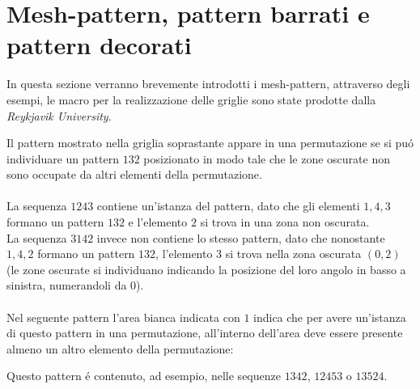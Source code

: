 \section*{Mesh-pattern, pattern barrati e pattern decorati}
In questa sezione verranno brevemente introdotti i mesh-pattern\cite{branden2011mesh}, attraverso degli esempi, le macro per la realizzazione delle griglie sono state prodotte dalla \textit{Reykjavik University}\cite{patternmacros}.
\begin{center}
\end{center}
Il pattern mostrato nella griglia soprastante appare in una permutazione se si pu\'o individuare un pattern $132$ posizionato in modo tale che le zone oscurate non sono occupate da altri elementi della permutazione.\\\\
La sequenza $1243$ contiene un'istanza del pattern, dato che gli elementi $1,4,3$ formano un pattern $132$ e l'elemento $2$ si trova in una zona non oscurata.\\
La sequenza $3142$ invece non contiene lo stesso pattern, dato che nonostante $1,4,2$ formano un pattern $132$, l'elemento 3 si trova nella zona oscurata $(0,2)$ (le zone oscurate si individuano indicando la posizione del loro angolo in basso a sinistra, numerandoli da $0$).\\\\
Nel seguente pattern l'area bianca indicata con $1$ indica che per avere un'istanza di questo pattern in una permutazione, all'interno dell'area deve essere presente almeno un altro elemento della permutazione: 
\begin{center}
\end{center}
Questo pattern \'e contenuto, ad esempio, nelle sequenze $1342$, $12453$ o $13524$.